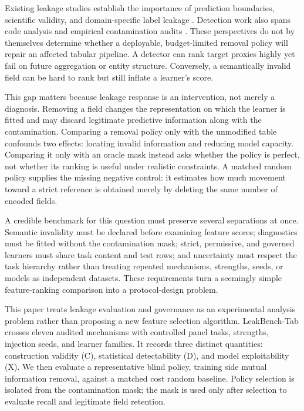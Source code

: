 \documentclass[sigconf,review]{acmart}
\begin{document}
Existing leakage studies establish the importance of prediction boundaries,
scientific validity, and domain-specific label leakage
\cite{davis2024framework,rosenblatt2024connectome}. Detection work also spans
code analysis and empirical contamination audits
\cite{subotic2022static,magar2022contamination}. These perspectives do not by
themselves determine whether a deployable, budget-limited removal policy will
repair an affected tabular pipeline. A detector can rank target proxies highly
yet fail on future aggregation or entity structure. Conversely, a semantically
invalid field can be hard to rank but still inflate a learner's score.

This gap matters because leakage response is an intervention, not merely a
diagnosis. Removing a field changes the representation on which the learner is
fitted and may discard legitimate predictive information along with the
contamination. Comparing a removal policy only with the unmodified table
confounds two effects: locating invalid information and reducing model
capacity. Comparing it only with an oracle mask instead asks whether the policy
is perfect, not whether its ranking is useful under realistic constraints. A
matched random policy supplies the missing negative control: it estimates how
much movement toward a strict reference is obtained merely by deleting the
same number of encoded fields.

A credible benchmark for this question must preserve several separations at
once. Semantic invalidity must be declared before examining feature scores;
diagnostics must be fitted without the contamination mask; strict, permissive,
and governed learners must share task content and test rows; and uncertainty
must respect the task hierarchy rather than treating repeated mechanisms,
strengths, seeds, or models as independent datasets. These requirements turn a
seemingly simple feature-ranking comparison into a protocol-design problem.

This paper treats leakage evaluation and governance as an experimental analysis
problem rather than proposing a new feature selection algorithm. LeakBench-Tab
crosses eleven audited mechanisms with controlled panel tasks,
strengths, injection seeds, and learner families. It records three distinct
quantities: construction validity (C), statistical detectability (D), and model
exploitability (X). We then evaluate a representative blind policy, training
side mutual information removal, against a matched cost random baseline. Policy
selection is isolated from the contamination mask; the mask is used only after
selection to evaluate recall and legitimate field retention.
\end{document}
